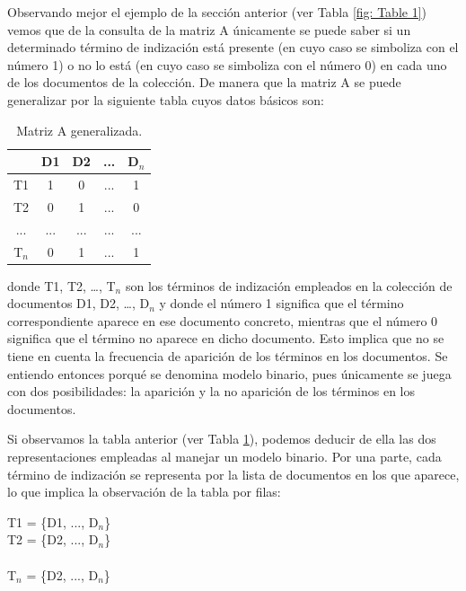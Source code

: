 \documentclass{article}
\begin{document}
Observando mejor el ejemplo de la sección anterior (ver Tabla \ref{fig: Table 1}) vemos que de la consulta de la matriz A únicamente se puede saber si un determinado término de indización está presente (en cuyo caso se simboliza con el número 1) o no lo está (en cuyo caso se simboliza con el número 0) en cada uno de los documentos de la colección. De manera que la matriz A se puede generalizar por la siguiente tabla cuyos datos básicos son:

\begin{table}[h]
	\begin{center}
		\begin{tabular}{ |c|c|c|c|c| }
			\hline 
			& D1 & D2 & ... & D$_{n}$ \\ 
			\hline
			T1 & 1 & 0 & ... & 1 \\ 
			\hline
			T2 & 0 & 1 & ... & 0 \\ 
			\hline
			... & ... & ...	& ... & ... \\
			\hline
			T$_{n}$ & 0 & 1 & ... & 1 \\ 
			\hline
		\end{tabular}
		\caption{Matriz A generalizada.}
		\label{fig: Table 2}
	\end{center}
\end{table}

donde T1, T2, …, T$_{n}$ son los términos de indización empleados en la colección de documentos D1, D2, …, D$_{n}$ y donde el número 1 significa que el término correspondiente aparece en ese documento concreto, mientras que el número 0 significa que el término no aparece en dicho documento. Esto implica que no se tiene en cuenta la frecuencia de aparición de los términos en los documentos. Se entiendo entonces porqué se denomina modelo binario, pues únicamente se juega con dos posibilidades: la aparición y la no aparición de los términos en los documentos.

Si observamos la tabla anterior (ver Tabla \ref{fig: Table 2}), podemos deducir de ella las dos representaciones empleadas al manejar un modelo binario. Por una parte, cada término de indización se representa por la lista de documentos en los que aparece, lo que implica la observación de la tabla por filas:

\begin{center}
	T1 = \{D1, ..., D$_{n}$\} \\
	T2 = \{D2, ..., D$_{n}$\} \\
	 \\
	T$_{n}$ = \{D2, ..., D$_{n}$\} \\
\end{center}
\end{document}

